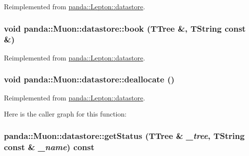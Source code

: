 Reimplemented from \hyperlink{structpanda_1_1Lepton_1_1datastore_a109ac02caed6e0a69a1b00248d80500e}{panda::Lepton::datastore}.\hypertarget{structpanda_1_1Muon_1_1datastore_ae3244041804870c1792c7ad3cd96ee53}{
\subsubsection[{book}]{\setlength{\rightskip}{0pt plus 5cm}void panda::Muon::datastore::book (TTree \&, \/  TString const \&)}}
\label{structpanda_1_1Muon_1_1datastore_ae3244041804870c1792c7ad3cd96ee53}


Reimplemented from \hyperlink{structpanda_1_1Lepton_1_1datastore_ab6cf5ada9f43228301c6bd97b9b6238a}{panda::Lepton::datastore}.\hypertarget{structpanda_1_1Muon_1_1datastore_aed9de75b6fb1e71671aa8a5b00862ace}{
\subsubsection[{deallocate}]{\setlength{\rightskip}{0pt plus 5cm}void panda::Muon::datastore::deallocate ()}}
\label{structpanda_1_1Muon_1_1datastore_aed9de75b6fb1e71671aa8a5b00862ace}


Reimplemented from \hyperlink{structpanda_1_1Lepton_1_1datastore_a527515ee96020a4aaef41d9de157c131}{panda::Lepton::datastore}.

Here is the caller graph for this function:\hypertarget{structpanda_1_1Muon_1_1datastore_aa1c3edc46b6ca55e9b77634cdd0e6684}{
\subsubsection[{getStatus}]{ panda::Muon::datastore::getStatus (TTree \& {\em \_\-tree}, \/  TString const \& {\em \_\-name}) const}}
\label{structpanda_1_1Muon_1_1datastore_aa1c3edc46b6ca55e9b77634cdd0e6684}


